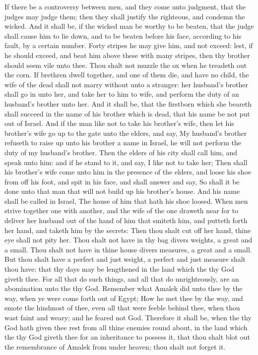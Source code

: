 \begin{biblechapter} %
\verse If there be a controversy between men, and they come unto judgment, that the judges may judge them; then they shall justify the righteous, and condemn the wicked.
\verse And it shall be, if the wicked man be worthy to be beaten, that the judge shall cause him to lie down, and to be beaten before his face, according to his fault, by a certain number.
\verse Forty stripes he may give him, and not exceed: lest, if he should exceed, and beat him above these with many stripes, then thy brother should seem vile unto thee.
\verse Thou shalt not muzzle the ox when he treadeth out the corn.
\verse If brethren dwell together, and one of them die, and have no child, the wife of the dead shall not marry without unto a stranger: her husband's brother shall go in unto her, and take her to him to wife, and perform the duty of an husband's brother unto her.
\verse And it shall be, that the firstborn which she beareth shall succeed in the name of his brother which is dead, that his name be not put out of Israel.
\verse And if the man like not to take his brother's wife, then let his brother's wife go up to the gate unto the elders, and say, My husband's brother refuseth to raise up unto his brother a name in Israel, he will not perform the duty of my husband's brother.
\verse Then the elders of his city shall call him, and speak unto him: and if he stand to it, and say, I like not to take her;
\verse Then shall his brother's wife come unto him in the presence of the elders, and loose his shoe from off his foot, and spit in his face, and shall answer and say, So shall it be done unto that man that will not build up his brother's house.
\verse And his name shall be called in Israel, The house of him that hath his shoe loosed.
\verse When men strive together one with another, and the wife of the one draweth near for to deliver her husband out of the hand of him that smiteth him, and putteth forth her hand, and taketh him by the secrets:
\verse Then thou shalt cut off her hand, thine eye shall not pity her.
\verse Thou shalt not have in thy bag divers weights, a great and a small.
\verse Thou shalt not have in thine house divers measures, a great and a small.
\verse But thou shalt have a perfect and just weight, a perfect and just measure shalt thou have: that thy days may be lengthened in the land which the \LORD thy God giveth thee.
\verse For all that do such things, and all that do unrighteously, are an abomination unto the \LORD thy God.
\verse Remember what Amalek did unto thee by the way, when ye were come forth out of Egypt;
\verse How he met thee by the way, and smote the hindmost of thee, even all that were feeble behind thee, when thou wast faint and weary; and he feared not God.
\verse Therefore it shall be, when the \LORD thy God hath given thee rest from all thine enemies round about, in the land which the \LORD thy God giveth thee for an inheritance to possess it, that thou shalt blot out the remembrance of Amalek from under heaven; thou shalt not forget it.
\end{biblechapter}

